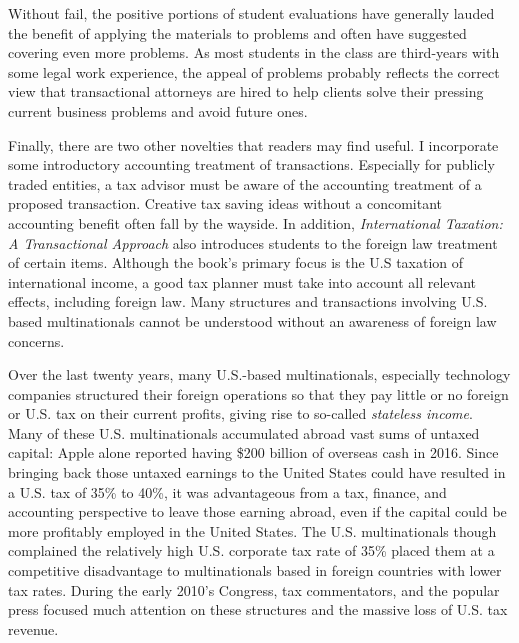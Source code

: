 Without fail, the positive portions of student evaluations have generally lauded the benefit of applying the materials to problems and often have suggested covering even more problems.  As most students in the class are third-years with some legal work experience, the appeal of problems probably reflects the correct view that transactional attorneys are hired to help clients solve their pressing current business problems and avoid future ones.  

Finally, there are two other novelties that readers may find useful.  I incorporate some introductory accounting treatment of transactions.  Especially for publicly traded entities, a tax advisor must be aware of the accounting treatment of a proposed transaction.  Creative tax saving ideas without a concomitant accounting benefit often fall by the wayside.  In addition,  \textit{International Taxation: A Transactional Approach} also introduces students to the foreign law treatment of certain items.  Although the book's primary focus is the U.S taxation of international income, a good tax planner must take into account all relevant effects, including foreign law.  Many structures and transactions involving U.S. based multinationals cannot be understood without an awareness of foreign law concerns.

 Over the last twenty years, many U.S.-based multinationals, especially technology companies structured their foreign operations so that they pay little or no foreign or U.S. tax on their current profits, giving rise to so-called \emph{stateless income}.  Many of these U.S. multinationals accumulated abroad vast sums of untaxed capital: Apple alone reported having \$200 billion of overseas cash in 2016. Since bringing back those untaxed earnings to the United States could have resulted in a U.S. tax of 35\% to 40\%, it was advantageous from a tax, finance, and accounting perspective to leave those earning abroad, even if the capital could be more profitably employed in the United States.  The U.S. multinationals though complained the relatively high U.S. corporate tax rate of 35\% placed them at a competitive disadvantage to multinationals based in foreign countries with lower tax rates.  During the early 2010's Congress, tax commentators, and the popular press focused much attention on these structures and the massive loss of U.S. tax revenue.  


